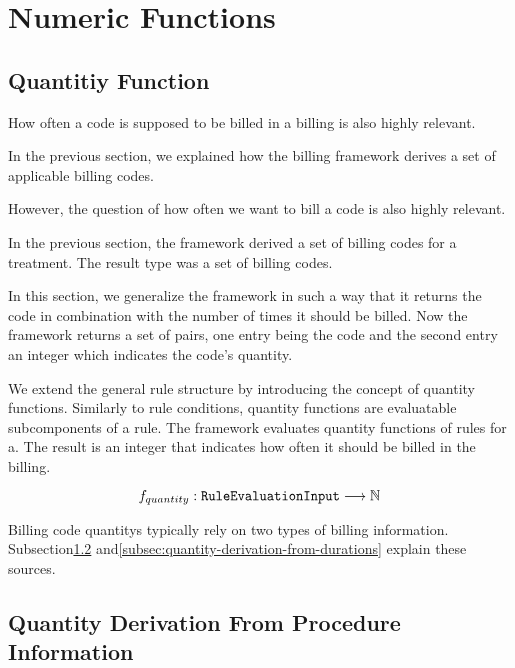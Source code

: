 \section{Numeric Functions}\label{sec:numeric-functions}

\subsection{Quantitiy Function}\label{sec:quantity-function-requirements}

How often a code is supposed to be billed in a billing is also highly relevant.

In the previous section, we explained how the billing framework derives a set of applicable billing codes.

However, the question of how often we want to bill a code is also highly relevant.

In the previous section, the framework derived a set of billing codes for a treatment.
The result type was a set of billing codes.

In this section, we generalize the framework in such a way that
it returns the code in combination with the number of times it should be billed.
Now the framework returns a set of pairs, one entry being the code and the second entry an integer which indicates the code's quantity.

We extend the general rule structure by introducing the concept of quantity functions.
Similarly to rule conditions, quantity functions are evaluatable subcomponents of a rule.
The framework evaluates quantity functions of rules for a.
The result is an integer that indicates how often it should be billed in the billing.

\begin{equation}
    \label{eq:quantity-function-natural}
    f_{quantity}: \texttt{RuleEvaluationInput} \longrightarrow \mathbb{N}
\end{equation}

Billing code quantitys typically rely on two types of billing information.
Subsection\ref{subsec:quantity-derivation-from-procedure-information} and\ref{subsec:quantity-derivation-from-durations} explain these sources.

\subsection{Quantity Derivation From Procedure Information}\label{subsec:quantity-derivation-from-procedure-information}

